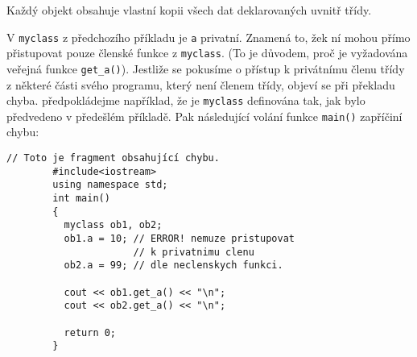       \begin{mdframed}[style=highlight]
        Každý objekt obsahuje vlastní kopii všech dat deklarovaných uvnitř třídy. 
      \end{mdframed}

      

      V \lstinline[style=luaCPPText]!myclass! z předchozího příkladu je
      \lstinline[style=luaCPPText]!a! privatní. Znamená to, žek ní mohou přímo přistupovat pouze
      členské funkce z \lstinline[style=luaCPPText]!myclass!. (To je důvodem, proč je vyžadována
      veřejná funkce \lstinline[style=luaCPPText]!get_a()!). Jestliže se pokusíme o přístup k
      privátnímu členu třídy z některé části svého programu, který není členem třídy, objeví se při
      překladu chyba. předpokládejme například, že je \lstinline[style=luaCPPText]!myclass!
      definována tak, jak bylo předvedeno v předešlém příkladě. Pak následující volání funkce
      \lstinline[style=luaCPPText]!main()! zapříčiní chybu: 
      \begin{lstlisting}[style=luaCPPStyle]
        // Toto je fragment obsahující chybu.
        #include<iostream>
        using namespace std;
        int main()
        {
          myclass ob1, ob2;
          ob1.a = 10; // ERROR! nemuze pristupovat
                      // k privatnimu clenu
          ob2.a = 99; // dle neclenskych funkci.

          cout << ob1.get_a() << "\n";
          cout << ob2.get_a() << "\n";

          return 0;
        }
      \end{lstlisting}

